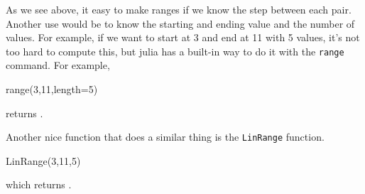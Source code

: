 As we see above, it easy to make ranges if we know the step between each pair.  Another use would be to know the starting and ending value and the number of values.  For example, if we want to start at 3 and end at 11 with 5 values, it's not too hard to compute this, but julia has a built-in way to do it with the \verb!range! command.  For example,
\begin{jlblock}[bool]
range(3,11,length=5)
\end{jlblock}
returns  \printpythontex[verb].  

Another nice function that does a similar thing is the \verb!LinRange! function. 
%
\begin{jlblock}[bool]
LinRange(3,11,5)
\end{jlblock}
which returns  \printpythontex[verbatim].


